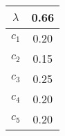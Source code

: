 \begin{figure}
\begin{minipage}[c]{0.07\columnwidth}
\begin{tabular}{c|c}
$\lambda$ & 0.66 \\\hline
$c_1$ & 0.20 \\
$c_2$ & 0.15 \\
$c_3$ & 0.25 \\
$c_4$ & 0.20 \\
$c_5$ & 0.20 \\
\end{tabular}
\end{minipage}


\end{figure}
